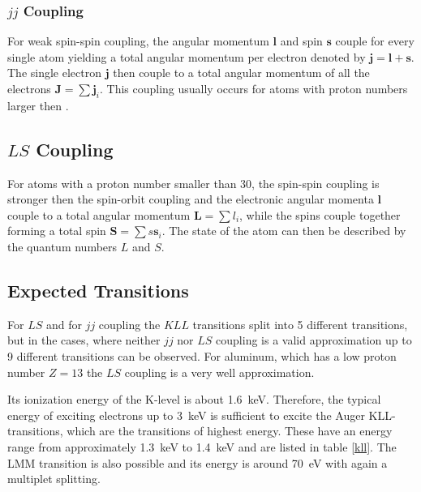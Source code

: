 \documentclass[a4paper]{scrartcl}
\numberwithin{equation}{section}
\numberwithin{figure}{section}
\numberwithin{table}{section}
\newcommand{\ve}[1]{\mathbf{ #1} }
\begin{document}
\subsubsection{$jj$ Coupling}
For weak spin-spin coupling, the angular momentum $\ve l$ and spin $\ve s$ couple for every single atom yielding a total angular momentum per electron denoted by $\ve j = \ve l + \ve s$. The single electron $\ve j$ then couple to a total angular momentum of all the electrons $\ve J=\sum \ve j_i$. This coupling usually occurs for atoms with proton numbers larger then .
\subsection{$LS$ Coupling}
For atoms with a proton number smaller than 30, the spin-spin coupling is stronger then the spin-orbit coupling and the electronic angular momenta $\ve l$ couple to a total angular momentum $\ve L =\sum l_i$, while the spins couple together forming a total spin $\ve S = \sum s\ve s_i$. The state of the atom can then be described by the quantum numbers $L$ and $S$.


\subsection{Expected Transitions}
For $LS$ and for $jj$ coupling the $KLL$ transitions split into 5 different transitions, but in the cases, where neither $jj$ nor $LS$ coupling is a valid approximation up to 9 different transitions can be observed. For aluminum, which has a low proton number $Z=13$ the $LS$ coupling is a very well approximation.


Its ionization energy of the K-level is about \SI{1,6}{keV}. Therefore, the typical energy of exciting electrons up to \SI{3}{keV} is sufficient to excite the Auger KLL-transitions, which are the transitions of highest energy. These have an energy range from approximately \SI{1,3}{keV} to \SI{1,4}{keV} and are listed in table \ref{kll}. The LMM transition is also possible and its energy is around \SI{70}{eV} with again a multiplet splitting.

%
\end{document}
